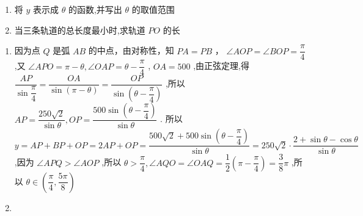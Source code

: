 \begin{enumerate}
    \begin{enumerate}
        \item 将 $y$ 表示成 $\theta$ 的函数,并写出 $\theta$ 的取值范围
        \item 当三条轨道的总长度最小时,求轨道 ${PO}$ 的长
    \end{enumerate}
    \begin{jieda}
        \begin{enumerate}
            \item 因为点 $Q$ 是弧 ${AB}$ 的中点，由对称性，知 ${PA} = {PB}$ ， $\angle {AOP} = \angle {BOP} = \dfrac{\pi }{4}$ ,又 $\angle {APO} = \pi  - \theta ,\angle {OAP} = \theta  - \dfrac{\pi }{4}$ , ${OA} = {500}$ ,由正弦定理,得 $\dfrac{AP}{\sin \dfrac{\pi }{4}} = \dfrac{OA}{\sin \left( {\pi  - \theta }\right) } = \dfrac{OP}{\sin \left( {\theta  - \dfrac{\pi }{4}}\right) }$ ,所以 ${AP} = \dfrac{{250}\sqrt{2}}{\sin \theta },{OP} = \dfrac{{500}\sin \left( {\theta  - \dfrac{\pi }{4}}\right) }{\sin \theta }$ . 所以 $y = {AP} + {BP} +  {OP} = {2AP} + {OP} = \dfrac{{500}\sqrt{2} + {500}\sin \left( {\theta  - \dfrac{\pi }{4}}\right) }{\sin \theta } = {250}\sqrt{2} \cdot \dfrac{2 + \sin \theta  - \cos \theta }{\sin \theta }$ ,因为 $\angle {APQ} > \angle {AOP}$ ,所以 $\theta  > \dfrac{\pi }{4},\angle {AQO} =  \angle {OAQ} = \dfrac{1}{2}\left( {\pi  - \dfrac{\pi }{4}}\right)  = \dfrac{3}{8}\pi$ ,所以 $\theta  \in  \left( {\dfrac{\pi }{4},\dfrac{5\pi }{8}}\right)$
            \item 
\end{enumerate}
\end{jieda}
\end{enumerate}
